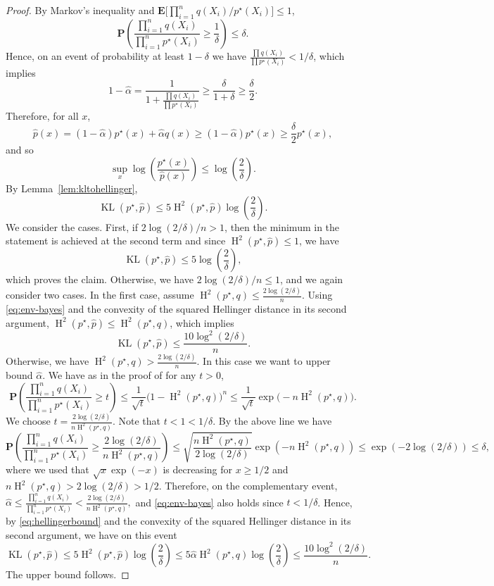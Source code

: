\documentclass[11pt]{article}
\newcommand{\E}{{\mathbf E}}
\renewcommand{\P}{\mathbf P}
\renewcommand{\le}{\leqslant}
\renewcommand{\ge}{\geqslant}
\newcommand{\kl}{\operatorname{KL}}
\newcommand{\hel}{\operatorname{H}}
\newcommand{\hels}{\hel^2}
\theoremstyle{definition}
\theoremstyle{remark}
\begin{document}
\begin{proof}
By Markov's inequality and $\E\big[\prod_{i=1}^n q(X_i)/p^\star(X_i)\big]\le 1$,
\[
\P\left(\frac{\prod_{i=1}^n q(X_i)}{\prod_{i=1}^n p^\star(X_i)}\ge \frac{1}{\delta}\right)\le \delta.
\]
Hence, on an event of probability at least $1-\delta$ we have $\frac{\prod q(X_i)}{\prod p^\star(X_i)}<1/\delta$, which implies
\[
1-\widehat\alpha=\frac{1}{1+\frac{\prod q(X_i)}{\prod p^\star(X_i)}}\ge \frac{\delta}{1+\delta}\ge \frac{\delta}{2}.
\]
Therefore, for all $x$, 
\[
\widehat p(x)=(1-\widehat\alpha)p^\star(x)+\widehat\alpha q(x)\ge (1-\widehat\alpha)p^\star(x)\ge \frac{\delta}{2}p^\star(x),
\]
and so
\begin{equation}
\label{eq:env-bayes}
\sup_{x}\log\left(\frac{p^\star(x)}{\widehat p(x)}\right)\le \log\left(\frac{2}{\delta}\right).
\end{equation}
By Lemma~\ref{lem:kltohellinger},
\begin{equation}
\label{eq:hellingerbound}
\kl(p^\star,\widehat p)\le 5\hels(p^\star,\widehat p)\log\left(\frac{2}{\delta}\right).
\end{equation}
We consider the cases. First, if $2\log(2/\delta)/n > 1$, then the minimum in the statement is achieved at the second term and since $\hels(p^\star,\widehat p) \le 1$, we have
\[
\kl(p^\star,\widehat p)\le 5\log\left(\frac{2}{\delta}\right),
\]
which proves the claim. Otherwise, we have $2\log(2/\delta)/n \le 1$, and we again consider two cases. In the first case, assume $\hels(p^\star,q)\le \frac{2\log(2/\delta)}{n}$.
Using \eqref{eq:env-bayes} and the convexity of the squared Hellinger distance in its second argument, $\hels(p^\star,\widehat p)\le \hels(p^\star,q)$, which implies
\[
\kl(p^\star,\widehat p)\le \frac{10\log^2(2/\delta)}{n}.
\]
Otherwise, we have $\hels(p^\star,q) > \frac{2\log(2/\delta)}{n}$. In this case we want to upper bound $\widehat{\alpha}$. We have as in the proof of  for any $t > 0$,
\[
\P\left(
\frac{\prod_{i=1}^n q(X_i)}{\prod_{i=1}^n p^\star(X_i)} \ge t
\right)
\le
\frac{1}{\sqrt{t}}\bigl(1-\hels(p^\star,q)\bigr)^n
\le
\frac{1}{\sqrt{t}} \exp\bigl(-n\hels(p^\star,q)\bigr).
\]
We choose $t = \frac{2\log(2/\delta)}{n\hels(p^\star,q)}$. Note that $t<1<1/\delta$. By the above line we have
\[
\P\left(
\frac{\prod_{i=1}^n q(X_i)}{\prod_{i=1}^n p^\star(X_i)}
\ge
\frac{2\log(2/\delta)}{n\hels(p^\star,q)}
\right)
\le
\sqrt{\frac{n\hels(p^\star,q)}{2\log(2/\delta)}}\exp(-n\hels(p^\star,q))
\le
\exp(-2\log(2/\delta))
\le
\delta,
\]
where we used that $\sqrt{x}\exp(-x)$ is decreasing for $x \ge 1/2$ and $n\hels(p^\star,q) > 2\log(2/\delta) > 1/2$. Therefore, on the complementary event,
$
\widehat{\alpha}
\le
\frac{\prod_{i=1}^n q(X_i)}{\prod_{i=1}^n p^\star(X_i)}
<
\frac{2\log(2/\delta)}{n\hels(p^\star,q)},
$
and \eqref{eq:env-bayes} also holds since $t<1/\delta$. 
Hence, by \eqref{eq:hellingerbound} and the convexity of the squared Hellinger distance in its second argument, we have on this event
\[
\kl(p^\star,\widehat p)
\le
5\hels(p^\star,\widehat p)\log\left(\frac{2}{\delta}\right)
\le
5\widehat{\alpha}\hels(p^\star,q)\log\left(\frac{2}{\delta}\right)
\le
\frac{10\log^2(2/\delta)}{n}.
\]
The upper bound follows.


\end{proof}
\end{document}
